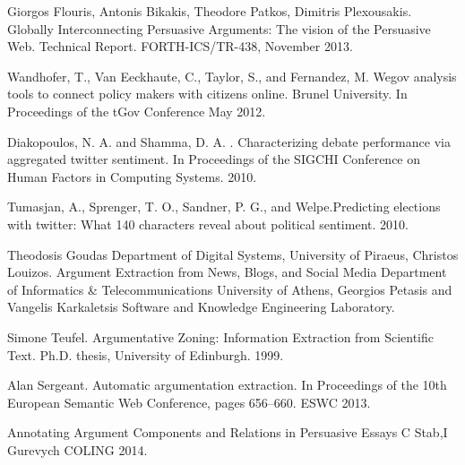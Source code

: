 \begin{thebibliography}{69}

 Giorgos Flouris, Antonis Bikakis, Theodore Patkos, Dimitris Plexousakis. Globally Interconnecting Persuasive Arguments: The vision of the Persuasive Web. Technical Report. FORTH-ICS/TR-438, November 2013.

 Wandhofer, T., Van Eeckhaute, C., Taylor, S., and Fernandez, M.  Wegov analysis tools to connect policy makers with citizens online. Brunel University. In Proceedings of the tGov Conference May 2012.

 Diakopoulos, N. A. and Shamma, D. A. . Characterizing debate performance via aggregated twitter sentiment. In Proceedings of the SIGCHI Conference on Human Factors in Computing Systems. 2010.

 Tumasjan, A., Sprenger, T. O., Sandner, P. G., and Welpe.Predicting elections with twitter: What 140 characters reveal about political sentiment. 2010.

 Theodosis Goudas Department of Digital Systems, University of Piraeus, Christos Louizos. Argument Extraction from News, Blogs, and Social Media  Department of Informatics \& Telecommunications University of Athens, Georgios Petasis  and Vangelis Karkaletsis Software and Knowledge Engineering Laboratory.

 Simone Teufel.  Argumentative Zoning: Information Extraction from Scientific Text. Ph.D. thesis, University of Edinburgh. 1999.

 Alan Sergeant.  Automatic argumentation extraction. In Proceedings of the 10th European Semantic Web Conference, pages 656–660. ESWC 2013.

 Annotating Argument Components and Relations in Persuasive Essays C Stab,I Gurevych COLING 2014.


\end{thebibliography}
